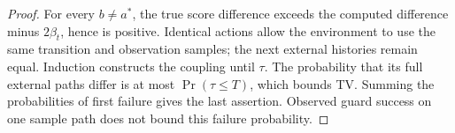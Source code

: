 \begin{proof}
For every $b\ne a^*$, the true score difference exceeds the computed
difference minus $2\beta_t$, hence is positive. Identical actions allow
the environment to use the same transition and observation samples; the
next external histories remain equal. Induction constructs the coupling
until $\tau$. The probability that its full external paths differ is at
most $\Pr(\tau\le T)$, which bounds TV. Summing the probabilities of
first failure gives the last assertion. Observed guard success on one
sample path does not bound this failure probability.
\end{proof}
